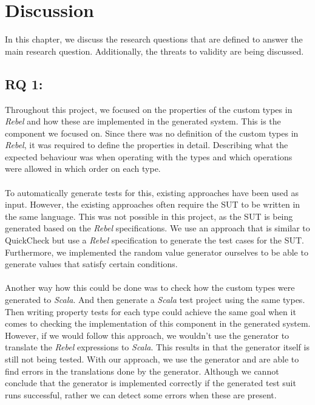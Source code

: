 \chapter{Discussion}
\label{cpt:7_discussion}
In this chapter, we discuss the research questions that are defined to answer the main research question. Additionally, the threats to validity are being discussed.

\section{RQ 1: \rqOne}
Throughout this project, we focused on the properties of the custom types in \textit{Rebel} and how these are implemented in the generated system. This is the component we focused on. Since there was no definition of the custom types in \textit{Rebel}, it was required to define the properties in detail. Describing what the expected behaviour was when operating with the types and which operations were allowed in which order on each type.\\\
\\
To automatically generate tests for this, existing approaches have been used as input. However, the existing approaches often require the SUT to be written in the same language. This was not possible in this project, as the SUT is being generated based on the \textit{Rebel} specifications. We use an approach that is similar to QuickCheck but use a \textit{Rebel} specification to generate the test cases for the SUT. Furthermore, we implemented the random value generator ourselves to be able to generate values that satisfy certain conditions.\\
\\
Another way how this could be done was to check how the custom types were generated to \textit{Scala}. And then generate a \textit{Scala} test project using the same types. Then writing property tests for each type could achieve the same goal when it comes to checking the implementation of this component in the generated system. However, if we would follow this approach, we wouldn't use the generator to translate the \textit{Rebel} expressions to \textit{Scala}. This results in that the generator itself is still not being tested. With our approach, we use the generator and are able to find errors in the translations done by the generator. Although we cannot conclude that the generator is implemented correctly if the generated test suit runs successful, rather we can detect some errors when these are present.

